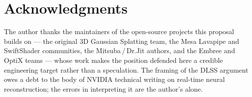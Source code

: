 \documentclass[10pt,journal,onecolumn]{IEEEtran}
\begin{document}
\section*{Acknowledgments}
The author thanks the maintainers of the open-source projects this
proposal builds on --- the original 3D Gaussian Splatting team, the
Mesa Lavapipe and SwiftShader communities, the Mitsuba\,/\,Dr.Jit
authors, and the Embree and OptiX teams --- whose work makes the
position defended here a credible engineering target rather than a
speculation. The framing of the DLSS argument owes a debt to the body
of NVIDIA technical writing on real-time neural reconstruction; the
errors in interpreting it are the author's alone.



\end{document}
